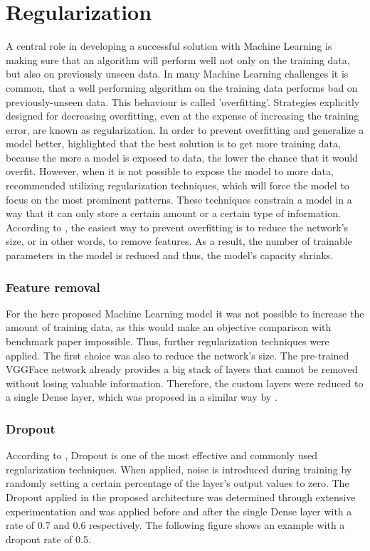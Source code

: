 \section{Regularization}
A central role in developing a successful solution with Machine Learning is making sure that an algorithm will perform well not only on the training data, but also on previously unseen data. In many Machine Learning challenges it is common, that a well performing algorithm on the training data performs bad on previously-unseen data. This behaviour is called 'overfitting'. Strategies explicitly designed for decreasing overfitting, even at the expense of increasing the training error, are known as regularization. \citep{Goodfellow:2016:DeepLearning}
\newline\newline
In order to prevent overfitting and generalize a model better, \citet{Chollet:2017:DeepLearningPython} highlighted that the best solution is to get more training data, because the more a model is exposed to data, the lower the chance that it would overfit. However, when it is not possible to expose the model to more data, \citet{Chollet:2017:DeepLearningPython} recommended utilizing regularization techniques, which will force the model to focus on the most prominent patterns. These techniques constrain a model in a way that it can only store a certain amount or a certain type of information. According to \citet{Chollet:2017:DeepLearningPython}, the easiest way to prevent overfitting is to reduce the network's size, or in other words, to remove features. As a result, the number of trainable parameters in the model is reduced and thus, the model's capacity shrinks.

\subsubsection{Feature removal}
For the here proposed Machine Learning model it was not possible to increase the amount of training data, as this would make an objective comparison with benchmark paper impossible. Thus, further regularization techniques were applied. The first choice was also to reduce the network's size. The pre-trained VGGFace network already provides a big stack of layers that cannot be removed without losing valuable information. Therefore, the custom layers were reduced to a single Dense layer, which was proposed in a similar way by \citet{Pittaras:2017:FineTuningStrategiesComparison}.

\subsubsection{Dropout}
According to \citet{Chollet:2017:DeepLearningPython}, Dropout is one of the most effective and commonly used regularization techniques. When applied, noise is introduced during training by randomly setting a certain percentage of the layer's output values to zero. The Dropout applied in the proposed architecture was determined through extensive experimentation and was applied before and after the single Dense layer with a rate of 0.7 and 0.6 respectively. The following figure shows an example with a dropout rate of 0.5.

